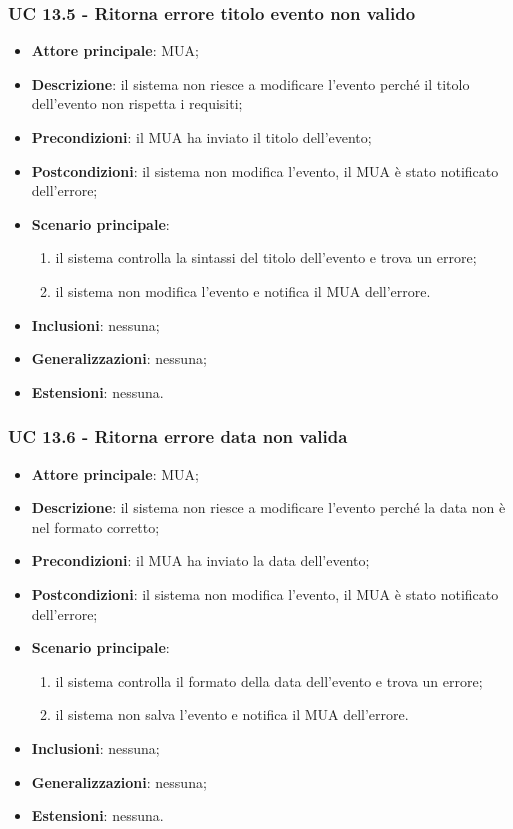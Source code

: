     \subsubsection{UC 13.5 - Ritorna errore titolo evento non valido} \label{sec:UC13.5}
    \begin{itemize}
        \item \textbf{Attore principale}: MUA;
        \item \textbf{Descrizione}: il sistema non riesce a modificare l'evento perché il titolo dell'evento non rispetta i requisiti;
        \item \textbf{Precondizioni}: il MUA ha inviato il titolo dell'evento;
        \item \textbf{Postcondizioni}: il sistema non modifica l'evento, il MUA è stato notificato dell'errore;
        \item \textbf{Scenario principale}:
            \begin{enumerate}
                \item il sistema controlla la sintassi del titolo dell'evento e trova un errore;
                \item il sistema non modifica l'evento e notifica il MUA dell'errore.
            \end{enumerate}
        \item \textbf{Inclusioni}: nessuna;
        \item \textbf{Generalizzazioni}: nessuna;
        \item \textbf{Estensioni}: nessuna.
    \end{itemize}


    \subsubsection{UC 13.6 - Ritorna errore data non valida} \label{sec:UC13.6}
    \begin{itemize}
        \item \textbf{Attore principale}: MUA;
        \item \textbf{Descrizione}: il sistema non riesce a modificare l'evento perché la data non è nel formato corretto;
        \item \textbf{Precondizioni}: il MUA ha inviato la data dell'evento;
        \item \textbf{Postcondizioni}: il sistema non modifica l'evento, il MUA è stato notificato dell'errore;
        \item \textbf{Scenario principale}:
            \begin{enumerate}
                \item il sistema controlla il formato della data dell'evento e trova un errore;
                \item il sistema non salva l'evento e notifica il MUA dell'errore.
            \end{enumerate}
        \item \textbf{Inclusioni}: nessuna;
        \item \textbf{Generalizzazioni}: nessuna;
        \item \textbf{Estensioni}: nessuna.
    \end{itemize}

